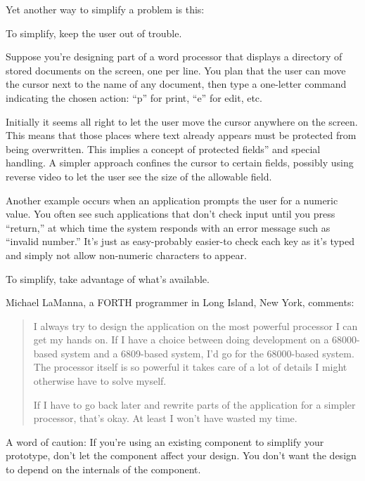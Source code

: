 Yet another way to simplify a problem is this:

\begin{tip}
To simplify, keep the user out of trouble.
\end{tip}

\noindent Suppose you're designing part of a word processor that displays a
directory of stored documents on the screen, one per line. You plan that the
user can move the cursor next to the name of any document, then type a
one-letter command indicating the chosen action: ``p'' for print, ``e'' for
edit, etc.

Initially it seems all right to let the user move the cursor anywhere
on the screen. This means that those places where text already appears
must be protected from being overwritten. This implies a concept of 
protected fields'' and special handling. A simpler approach confines the
cursor to certain fields, possibly using reverse video to let the user see the
size of the allowable field.

Another example occurs when an application prompts the user for a
numeric value. You often see such applications that don't check input
until you press ``return,'' at which time the system responds with an error
message such as ``invalid number.'' It's just as easy-probably easier-to
check each key as it's typed and simply not allow non-numeric characters
to appear.

\begin{tip}
To simplify, take advantage of what's available.
\end{tip}

\blackline{2ex}
\noindent Michael LaManna, a FORTH programmer in Long Island, New York, comments:

\begin{quotation}
\noindent I always try to design the application on the most powerful processor I can
get my hands on. If I have a choice between doing development on a
68000-based system and a 6809-based system, I'd go for the 68000-based
system. The processor itself is so powerful it takes care of a lot of details I
might otherwise have to solve myself.

If I have to go back later and rewrite parts of the application for a simpler
processor, that's okay. At least I won't have wasted my time.
\end{quotation}
\blackline{2ex}

\noindent A word of caution: If you're using an existing component to simplify
your prototype, don't let the component affect your design. You don't
want the design to depend on the internals of the component.

